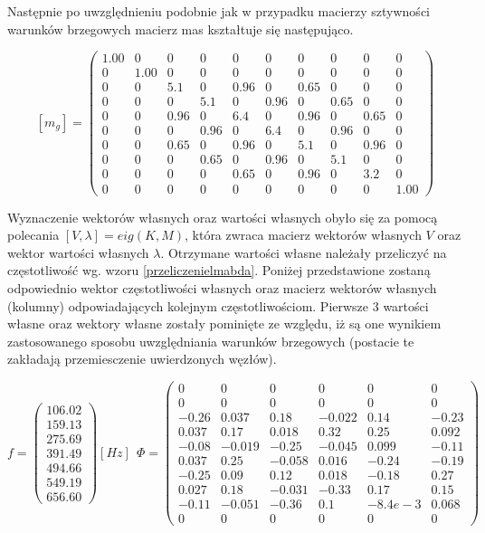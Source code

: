 \documentclass[12pt, a4papper, twoside]{article}
\begin{document}
\newpage

Następnie po uwzględnieniu podobnie jak w przypadku macierzy sztywności warunków brzegowych macierz mas kształtuje się następująco.

$$ [m_{g}] = \left(\begin{array}{cccccccccc} 1.00 & 0 & 0 & 0 & 0 & 0 & 0 & 0 & 0 & 0\\ 0 & 1.00 & 0 & 0 & 0 & 0 & 0 & 0 & 0 & 0\\ 0 & 0 & 5.1 & 0 & 0.96 & 0 & 0.65 & 0 & 0 & 0\\ 0 & 0 & 0 & 5.1 & 0 & 0.96 & 0 & 0.65 & 0 & 0\\ 0 & 0 & 0.96 & 0 & 6.4 & 0 & 0.96 & 0 & 0.65 & 0\\ 0 & 0 & 0 & 0.96 & 0 & 6.4 & 0 & 0.96 & 0 & 0\\ 0 & 0 & 0.65 & 0 & 0.96 & 0 & 5.1 & 0 & 0.96 & 0\\ 0 & 0 & 0 & 0.65 & 0 & 0.96 & 0 & 5.1 & 0 & 0\\ 0 & 0 & 0 & 0 & 0.65 & 0 & 0.96 & 0 & 3.2 & 0\\ 0 & 0 & 0 & 0 & 0 & 0 & 0 & 0 & 0 & 1.00 \end{array}\right) $$

Wyznaczenie wektorów własnych oraz wartości własnych obyło się za pomocą polecania $[V, \lambda] = eig(K, M)$, która zwraca macierz wektorów własnych $V$ oraz wektor wartości własnych $\lambda$. Otrzymane wartości własne należały przeliczyć na częstotliwość wg. wzoru \ref{przeliczenielmabda}. Poniżej przedstawione zostaną odpowiednio wektor częstotliwości własnych oraz macierz wektorów własnych (kolumny) odpowiadających kolejnym częstotliwościom. Pierwsze 3 wartości własne oraz wektory własne zostały pominięte ze względu, iż są one wynikiem zastosowanego sposobu uwzględniania warunków brzegowych (postacie te zakładają przemiesczenie uwierdzonych węzłów).

$$ f = \left(\begin{array}{c}  106.02\\ 159.13\\ 275.69\\ 391.49\\ 494.66\\ 549.19\\ 656.60 \end{array}\right) [Hz] \ \  \Phi = \left(\begin{array}{cccccc} 0 & 0 & 0 & 0 & 0 & 0\\ 0 & 0 & 0 & 0 & 0 & 0\\ -0.26 & 0.037 & 0.18 & -0.022 & 0.14 & -0.23\\ 0.037 & 0.17 & 0.018 & 0.32 & 0.25 & 0.092\\ -0.08 & -0.019 & -0.25 & -0.045 & 0.099 & -0.11\\ 0.037 & 0.25 & -0.058 & 0.016 & -0.24 & -0.19\\ -0.25 & 0.09 & 0.12 & 0.018 & -0.18 & 0.27\\ 0.027 & 0.18 & -0.031 & -0.33 & 0.17 & 0.15\\ -0.11 & -0.051 & -0.36 & 0.1 & -8.4e-3 & 0.068\\ 0 & 0 & 0 & 0 & 0 & 0 \end{array}\right) $$
\end{document}
